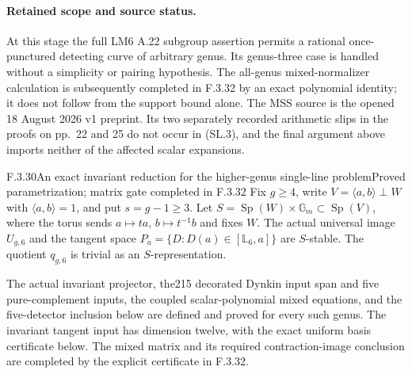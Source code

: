 \paragraph{Retained scope and source status.}
At this stage the full LM6 A.22 subgroup assertion permits a rational
once-punctured detecting curve of arbitrary genus. Its genus-three
case is handled without a simplicity or pairing hypothesis.
The all-genus mixed-normalizer calculation is subsequently completed
in F.3.32 by an exact polynomial identity; it does not follow
from the support bound alone. The MSS source is the opened
18 August 2026 v1 preprint. Its two separately recorded arithmetic
slips in the proofs on pp.~22 and 25 do not occur in (SL.3),
and the final argument above imports neither of the affected
scalar expansions.


\begin{result}{F.3.30}{An exact invariant reduction for the higher-genus single-line problem}{Proved parametrization; matrix gate completed in F.3.32}
Fix $g\geq4$, write $V=\langle a,b\rangle\perp W$ with
$\langle a,b\rangle=1$, and put $s=g-1\geq3$.
Let $S=\operatorname{Sp}(W)\times\mathbb G_m\subset
\operatorname{Sp}(V)$, where the torus sends $a\mapsto ta$,
$b\mapsto t^{-1}b$ and fixes $W$.
The actual universal image $U_{g,6}$ and the tangent space
$P_a=\{D:D(a)\in[\mathbb L_6,a]\}$ are $S$-stable.
The quotient $q_{g,6}$ is trivial as an $S$-representation.

The actual invariant projector, the215 decorated Dynkin input
span and five pure-complement inputs, the coupled scalar-polynomial
mixed equations, and the five-detector inclusion below are defined
and proved for every such genus. The invariant tangent input has
dimension twelve, with the exact uniform basis certificate below.
The mixed matrix and its required contraction-image conclusion
are completed by the explicit certificate in F.3.32.
\end{result}
